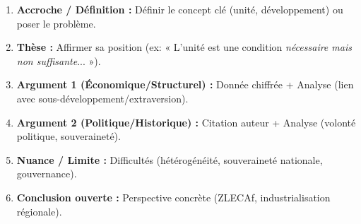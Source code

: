 \documentclass[11pt]{article}
\begin{document}
\begin{methode}
\begin{enumerate}
    \item \textbf{Accroche / Définition :} Définir le concept clé (unité, développement) ou poser le problème.
    \item \textbf{Thèse :} Affirmer sa position (ex: « L'unité est une condition \emph{nécessaire mais non suffisante}... »).
    \item \textbf{Argument 1 (Économique/Structurel) :} Donnée chiffrée + Analyse (lien avec sous-développement/extraversion).
    \item \textbf{Argument 2 (Politique/Historique) :} Citation auteur + Analyse (volonté politique, souveraineté).
    \item \textbf{Nuance / Limite :} Difficultés (hétérogénéité, souveraineté nationale, gouvernance).
    \item \textbf{Conclusion ouverte :} Perspective concrète (ZLECAf, industrialisation régionale).
\end{enumerate}
\end{methode}
\end{document}
